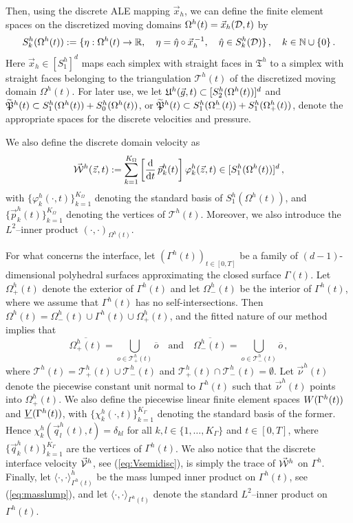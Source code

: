 Then, using the discrete ALE mapping
$\vec x_h$, we can define the finite element spaces on
the discretized moving domains $\Omega^h(t) = \vec x_h(\D,t)$ by
\begin{equation*}
S^h_k(\Omega^h(t)) :=
\{ \eta: \Omega^h(t)\to \R,\quad
\eta=\hat\eta\circ\vec x_h^{\,-1},\quad\hat\eta\in S^h_k(\D) \}\,,\quad
k \in \mathbb{N} \cup \{0\}\,.
\end{equation*}
Here $\vec x_h\in [S^h_1]^d$ maps each simplex with straight faces in
${\mathfrak T}^h$ to a simplex with straight faces belonging to the
triangulation $\mathcal{T}^h(t)$ of the discretized moving domain
$\Omega^h(t)$. For later use, we let $\uspacesemidiscale{g}{h}{t} \subset
[S^h_2(\Omega^h(t))]^d$ and $\pnormspaceale^h(t) \subset S^h_1(\Omega^h(t)) +
S^h_0(\Omega^h(t))$, or $\pnormspaceale^h(t) \subset S^h_1(\Omega_-^h(t)) +
S^h_1(\Omega_+^h(t))$, denote the appropriate spaces for the discrete
velocities and pressure.

We also define the discrete domain velocity as
\begin{equation}
\W^h(\vec z, t):=
\sum_{k=1}^{K_\Omega}\left[\ddt\,\vec p^h_k(t)\right] \varphi^h_k(\vec z, t)
\in [S^h_1(\Omega^h(t))]^d\,,
\end{equation}
with $\{\varphi^h_k(\cdot,t)\}_{k=1}^{K_\Omega}$ denoting the standard basis of
$S^h_1(\Omega^h(t))$, and $\{\vec p^h_k(t)\}_{k=1}^{K_\Omega}$ denoting the
vertices of $\mathcal {T}^h(t)$. Moreover, we also introduce the $L^2$--inner
product $(\cdot,\cdot)_{\Omega^h(t)}$.

For what concerns the interface, let $(\Gamma^h(t))_{t\in[0,T]}$  be a family of
$(d-1)$-dimensional polyhedral surfaces approximating the closed surface
$\Gamma(t)$. Let $\Omega^h_+(t)$ denote the exterior of $\Gamma^h(t)$ and let
$\Omega^h_-(t)$ be the interior of $\Gamma^h(t)$, where we assume that
$\Gamma^h(t)$ has no self-intersections. Then $\Omega^h(t) = \Omega_-^h(t) \cup
\Gamma^h(t) \cup \Omega_+^h(t)$, and the fitted nature of our method implies
that
\begin{equation} \label{eq:fittedO_ale}
\overline{\Omega^h_+(t)} = \bigcup_{o \in \mathcal{T}^h_+(t)} \overline{o}
\quad\text{and}\quad
\overline{\Omega^h_-(t)} = \bigcup_{o \in \mathcal{T}^h_-(t)} \overline{o} \,,
\end{equation}
where $\mathcal{T}^h(t) = \mathcal{T}^h_+(t) \cup \mathcal{T}^h_-(t)$ and
$\mathcal{T}^h_+(t) \cap \mathcal{T}^h_-(t) = \emptyset$.
Let $\vec \nu^h(t)$ denote the piecewise constant unit normal to $\Gamma^h(t)$
such that $\vec\nu^h(t)$ points into $\Omega^h_+(t)$. We also define the
piecewise linear finite element spaces $\Wht$ and $\Vht$, with
$\{\chi^h_k(\cdot,t)\}_{k=1}^{K_\Gamma}$ denoting the standard basis of the
former. Hence $\chi^h_k(\vec q^h_l(t),t) = \delta_{kl}$ for all
$k,l \in \{1,\ldots,K_\Gamma\}$ and $t \in [0,T]$, where
$\{\vec q^h_k(t)\}_{k=1}^{K_\Gamma}$ are the vertices of $\Gamma^h(t)$. We also
notice that the discrete interface velocity $\V^h$, see
(\ref{eq:Vsemidisc}), is simply the trace of $\W^h$ on $\Gamma^h$. Finally, let
$\langle\cdot,\cdot\rangle_{\Gamma^h(t)}^h$ be the mass lumped inner product on
$\Gamma^h(t)$, see (\ref{eq:masslump}), and let
$\langle\cdot,\cdot\rangle_{\Gamma^h(t)}$ denote the standard $L^2$--inner
product on $\Gamma^h(t)$.


